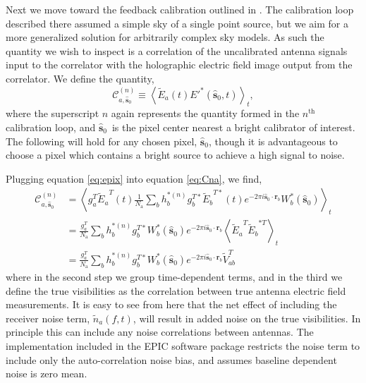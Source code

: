 \documentclass[a4paper,fleqn,usenatbib]{../mnras}
\newcommand{\Nant}{\ensuremath{N_{\mathrm{a}}}}
\newcommand{\spix}{\ensuremath{\hat{\mathbf{s}}_{0}}}
\newcommand{\Cna}[1][n]{\ensuremath{\mathcal{C}^{(#1)}_{a,\spix}}}
\newcommand{\rb}{\ensuremath{\mathbf{r}_b}}
\newcommand{\beamtheta}{\ensuremath{W}}
\newcommand{\Er}[1]{\ensuremath{\widetilde{E}_{#1}}}
\newcommand{\V}{\ensuremath{\widetilde{V}}}
\begin{document}
Next we move toward the feedback calibration outlined in \citealt{mor11}. The calibration loop described there assumed a simple sky of a single point source, but we aim for a more generalized solution for arbitrarily complex sky models. As such the quantity we wish to inspect is a correlation of the uncalibrated antenna signals input to the correlator with the holographic electric field image output from the correlator. We define the quantity,
\begin{equation}\label{eq:Cna}
\Cna \equiv \left<\Er{a}(t) E'^*(\spix,t)\right>_t,
\end{equation}
where the superscript $n$ again represents the quantity formed in the $n^\mathrm{th}$ calibration loop, and \spix\, is the pixel center nearest a bright calibrator of interest. The following will hold for any chosen pixel, \spix, though it is advantageous to choose a pixel which contains a bright source to achieve a high signal to noise. 

Plugging equation \ref{eq:epix} into equation \ref{eq:Cna}, we find,
\begin{align}\label{eq:cna}
\Cna & = \left<g^T_a \Er{a}^T(t) \frac{1}{\Nant} \sum_b h^{*(n)}_b g^{T*}_b\Er{b}^{T*}(t) e^{-2\pi i \spix \cdot \rb} \beamtheta^*_b(\spix)\right>_t \nonumber \\
& = \frac{g^T_a}{\Nant} \sum_b h^{*(n)}_b g^{T*}_b \beamtheta^*_b(\spix) e^{-2\pi i \spix \cdot \rb} \left<\Er{a}^T \Er{b}^{*T} \right>_t \nonumber \\
& = \frac{g^T_a}{\Nant} \sum_b h^{*(n)}_b g^{T*}_b \beamtheta^*_b(\spix) e^{-2\pi i \spix \cdot \rb} \V^T_{ab}
\end{align}
where in the second step we group time-dependent terms, and in the third we define the true visibilities as the correlation between true antenna electric field measurements. It is easy to see from here that the net effect of including the receiver noise term, $\widetilde{n}_a(f,t)$, will result in added noise on the true visibilities. In principle this can include any noise correlations between antennas. The implementation included in the EPIC software package restricts the noise term to include only the auto-correlation noise bias, and assumes baseline dependent noise is zero mean.
\end{document}

